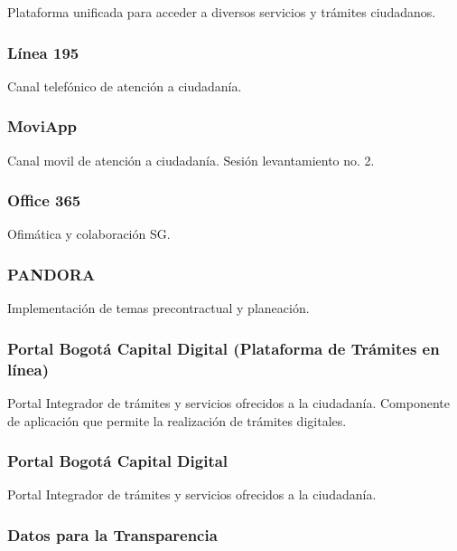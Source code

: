 \documentclass[
	a4paper, %
	12pt, %
]{include/CSSullivanBusinessReport}
\begin{document}
Plataforma unificada para acceder a diversos servicios y trámites
ciudadanos.

\subsubsection{Línea 195}\label{sec:luxednea-195}

Canal telefónico de atención a ciudadanía.

\subsubsection{MoviApp}\label{sec:moviapp}

Canal movil de atención a ciudadanía. Sesión levantamiento no. 2.

\subsubsection{Office 365}\label{sec:office-365}

Ofimática y colaboración SG.

\subsubsection{PANDORA}\label{sec:pandora}

Implementación de temas precontractual y planeación.

\subsubsection{Portal Bogotá Capital Digital (Plataforma de Trámites en
línea)}\label{sec:portal-bogotuxe1-capital-digital-plataforma-de-truxe1mites-en-luxednea}

Portal Integrador de trámites y servicios ofrecidos a la ciudadanía.
Componente de aplicación que permite la realización de trámites
digitales.

\subsubsection{Portal Bogotá Capital
Digital}\label{sec:portal-bogotuxe1-capital-digital}

Portal Integrador de trámites y servicios ofrecidos a la ciudadanía.

\subsubsection{Datos para la
Transparencia}\label{sec:datos-para-la-transparencia}
\end{document}
